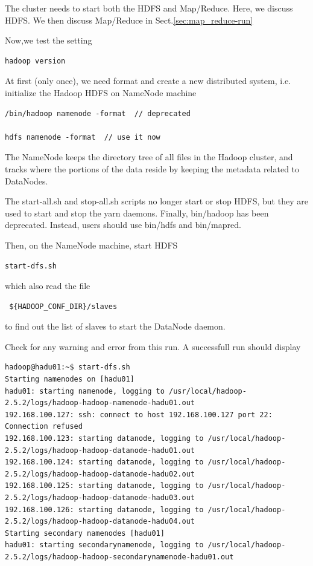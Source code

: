 The cluster needs to start both the HDFS and Map/Reduce. Here, we discuss HDFS.
We then discuss Map/Reduce in Sect.\ref{sec:map_reduce-run}
 
Now,we test the setting
\begin{verbatim}
hadoop version
\end{verbatim}

At first (only once), we need format and create a new distributed
system, i.e. initialize the Hadoop HDFS on NameNode machine
\begin{verbatim}
/bin/hadoop namenode -format  // deprecated

hdfs namenode -format  // use it now
\end{verbatim}
The NameNode keeps the directory tree of all files in the Hadoop cluster, and
tracks where the portions of the data reside by keeping the metadata related to
DataNodes.

\begin{mdframed}
The start-all.sh and stop-all.sh scripts no longer start or stop HDFS, but they
are used to start and stop the yarn daemons.  Finally, bin/hadoop has been
deprecated. Instead, users should use bin/hdfs and bin/mapred. 
\end{mdframed}

Then, on the NameNode machine, start HDFS 
\begin{verbatim}
start-dfs.sh
\end{verbatim}
which also read the file
\begin{verbatim}
 ${HADOOP_CONF_DIR}/slaves
\end{verbatim}
to find out the list of slaves to start the DataNode daemon.

Check for any warning and error from this run. A successfull run should display
\begin{verbatim}
hadoop@hadu01:~$ start-dfs.sh
Starting namenodes on [hadu01]
hadu01: starting namenode, logging to /usr/local/hadoop-2.5.2/logs/hadoop-hadoop-namenode-hadu01.out
192.168.100.127: ssh: connect to host 192.168.100.127 port 22: Connection refused
192.168.100.123: starting datanode, logging to /usr/local/hadoop-2.5.2/logs/hadoop-hadoop-datanode-hadu01.out
192.168.100.124: starting datanode, logging to /usr/local/hadoop-2.5.2/logs/hadoop-hadoop-datanode-hadu02.out
192.168.100.125: starting datanode, logging to /usr/local/hadoop-2.5.2/logs/hadoop-hadoop-datanode-hadu03.out
192.168.100.126: starting datanode, logging to /usr/local/hadoop-2.5.2/logs/hadoop-hadoop-datanode-hadu04.out
Starting secondary namenodes [hadu01]
hadu01: starting secondarynamenode, logging to /usr/local/hadoop-2.5.2/logs/hadoop-hadoop-secondarynamenode-hadu01.out
\end{verbatim}



